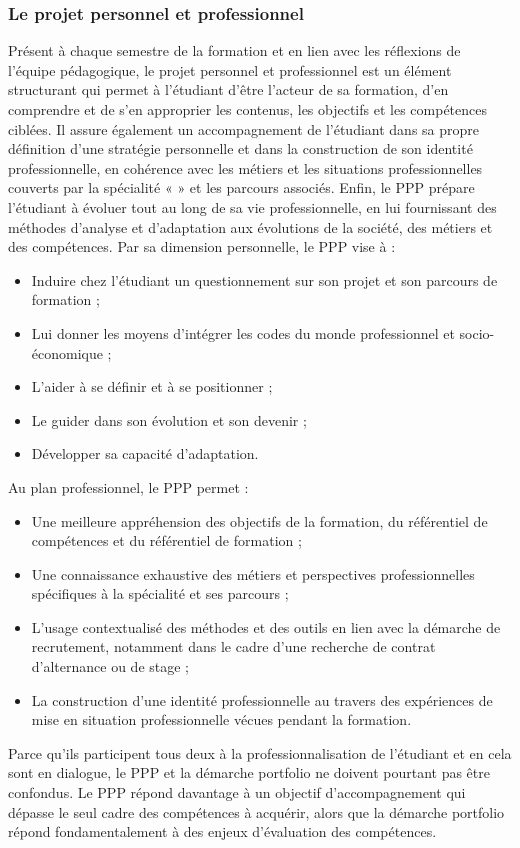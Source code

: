 \documentclass[10pt]{article}
\begin{document}
\subsubsection*{Le projet personnel et professionnel}
Présent à chaque semestre de la formation et en lien avec les réflexions
de l’équipe pédagogique, le projet personnel et professionnel est un
élément structurant qui permet à l’étudiant d’être l’acteur de sa
formation, d’en comprendre et de s’en approprier les contenus, les
objectifs et les compétences ciblées. Il assure également un
accompagnement de l’étudiant dans sa propre définition d’une stratégie
personnelle et dans la construction de son identité professionnelle, en
cohérence avec les métiers et les situations professionnelles couverts
par la spécialité «  » et les parcours associés. Enfin, le PPP prépare
l’étudiant à évoluer tout au long de sa vie professionnelle, en lui
fournissant des méthodes d’analyse et d’adaptation aux évolutions de la
société, des métiers et des compétences.  Par sa dimension personnelle,
le PPP vise à :
\begin{itemize}
\item Induire chez l’étudiant un questionnement sur
  son projet et son parcours de formation ;
\item Lui donner les moyens d’intégrer les codes du
  monde professionnel et socio-économique ;
\item L’aider à se définir et à se positionner ;
\item Le guider dans son évolution et son devenir ;
\item Développer sa capacité d’adaptation.
\end{itemize}
Au plan professionnel, le PPP permet :
\begin{itemize}
\item Une meilleure appréhension des objectifs de la formation, du
  référentiel de compétences et du référentiel de formation ;
\item Une connaissance exhaustive des métiers et perspectives
  professionnelles spécifiques à la spécialité et ses parcours ;
\item L’usage contextualisé des méthodes et des outils en lien avec la
  démarche de recrutement, notamment dans le cadre d’une recherche de
  contrat d’alternance ou de stage ;
\item La construction d’une identité professionnelle au travers des
  expériences de mise en situation professionnelle vécues pendant la
  formation.
\end{itemize}
Parce qu’ils participent tous deux à la professionnalisation de
l’étudiant et en cela sont en dialogue, le PPP et la démarche portfolio
ne doivent pourtant pas être confondus. Le PPP répond davantage à un
objectif d’accompagnement qui dépasse le seul cadre des compétences à
acquérir, alors que la démarche portfolio répond fondamentalement à des
enjeux d’évaluation des compétences.
\end{document}
